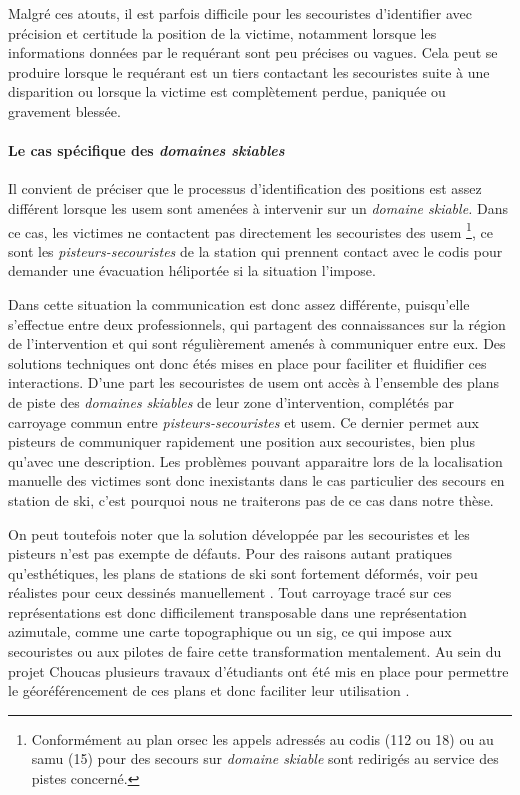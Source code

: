 Malgré ces atouts, il est parfois difficile pour les secouristes
d'identifier avec précision et certitude la position de la victime,
notamment lorsque les informations données par le requérant sont peu
précises ou vagues. Cela peut se produire lorsque le requérant est un
tiers contactant les secouristes suite à une disparition ou lorsque la
victime est complètement perdue, paniquée ou gravement blessée.

\paragraph{Le cas spécifique des \emph{domaines skiables}}

Il convient de préciser que le processus d'identification des
positions est assez différent lorsque les \ac{usem} sont amenées à
intervenir sur un \emph{domaine skiable.} Dans ce cas, les victimes ne
contactent pas directement les secouristes des \ac{usem}
\footnote{Conformément au plan \ac{orsec} les appels adressés au
  \ac{codis} (112 ou 18) ou au \ac{samu} (15) pour des secours sur
  \emph{domaine skiable} sont redirigés au service des pistes
  concerné.}, ce sont les \emph{pisteurs-secouristes} de la station
qui prennent contact avec le \ac{codis} pour demander une évacuation
héliportée si la situation l'impose.

Dans cette situation la communication est donc assez différente,
puisqu'elle s'effectue entre deux professionnels, qui partagent des
connaissances sur la région de l'intervention et qui sont
régulièrement amenés à communiquer entre eux. Des solutions techniques
ont donc étés mises en place pour faciliter et fluidifier ces
interactions. D'une part les secouristes de \ac{usem} ont accès à
l'ensemble des plans de piste des \emph{domaines skiables} de leur
zone d'intervention, complétés par carroyage commun entre
\emph{pisteurs-secouristes} et \ac{usem}. Ce dernier permet aux
pisteurs de communiquer rapidement une position aux secouristes, bien
plus qu'avec une description.  Les problèmes pouvant apparaitre lors
de la localisation manuelle des victimes sont donc inexistants dans le
cas particulier des secours en station de ski, c'est pourquoi nous ne
traiterons pas de ce cas dans notre thèse.

On peut toutefois noter que la solution développée par les secouristes
et les pisteurs n'est pas exempte de défauts. Pour des raisons autant
pratiques qu’esthétiques, les plans de stations de ski sont fortement
déformés, voir peu réalistes pour ceux dessinés manuellement
\autocite{Gauchon2014,LaPorte2017}. Tout carroyage tracé sur ces
représentations est donc difficilement transposable dans une
représentation azimutale, comme une carte topographique ou un
\ac{sig}, ce qui impose aux secouristes ou aux pilotes de faire cette
transformation mentalement. Au sein du projet Choucas plusieurs
travaux d'étudiants ont été mis en place pour permettre le
géoréférencement de ces plans et donc faciliter leur utilisation
\autocite{Gauer2019,Xi2020}.


